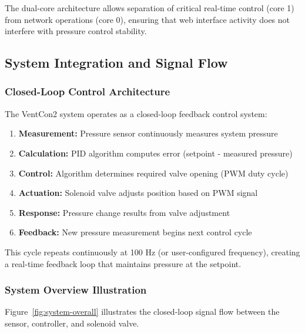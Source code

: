 \documentclass[12pt,a4paper]{article}
\begin{document}
The dual-core architecture allows separation of critical real-time control (core 1) from network operations (core 0), ensuring that web interface activity does not interfere with pressure control stability.

\subsection{System Integration and Signal Flow}

\subsubsection{Closed-Loop Control Architecture}

The VentCon2 system operates as a closed-loop feedback control system:

    \begin{enumerate}
        \item \textbf{Measurement:} Pressure sensor continuously measures system pressure
        \item \textbf{Calculation:} PID algorithm computes error (setpoint - measured pressure)
        \item \textbf{Control:} Algorithm determines required valve opening (PWM duty cycle)
        \item \textbf{Actuation:} Solenoid valve adjusts position based on PWM signal
        \item \textbf{Response:} Pressure change results from valve adjustment
        \item \textbf{Feedback:} New pressure measurement begins next control cycle
    \end{enumerate}

This cycle repeats continuously at 100 Hz (or user-configured frequency), creating a real-time feedback loop that maintains pressure at the setpoint.

\subsubsection{System Overview Illustration}

Figure~\ref{fig:system-overall} illustrates the closed-loop signal flow between the sensor, controller, and solenoid valve.
\end{document}

